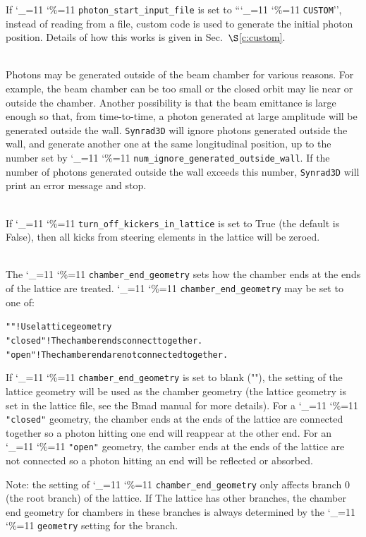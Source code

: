 \documentclass[11pt,openany]{report}
\newcommand{\sref}[1]{$\S$\ref{#1}}
\newcommand{\srthree}{\texttt{Synrad3D}\xspace}
\newcommand\ttcmd{\begingroup\catcode`\_=11 \catcode`\%=11 \dottcmd}
\newcommand\dottcmd[1]{\texttt{#1}\endgroup}
\newcommand{\vn}{\ttcmd}
\newcommand{\Newline}{\hfil \\}
\newlength{\ExBeg}
\newlength{\ExEnd}
\newenvironment{example}
  {\vspace{\ExBeg} \begin{alltt}}
  {\end{alltt} \vspace{\ExEnd}}
\begin{document}
\begin{description}
If \vn{photon_start_input_file} is set to ``\vn{CUSTOM}'', instead of reading from a file, custom
code is used to generate the initial photon position. Details of how this works is given
in Sec.~\sref{c:custom}.
  \item[\vn{num_ignore_generated_outside_wall}] \Newline
Photons may be generated outside of the beam chamber for various
reasons. For example, the beam chamber can be too small or the closed
orbit may lie near or outside the chamber. Another possibility is that
the beam emittance is large enough so that, from time-to-time, a
photon generated at large amplitude will be generated outside the
wall. \srthree will ignore photons generated outside the wall, and
generate another one at the same longitudinal position, up to the
number set by \vn{num_ignore_generated_outside_wall}. If the number of
photons generated outside the wall exceeds this number, \srthree will
print an error message and stop.
  \item[\vn{turn_off_kickers_in_lattice}] \Newline
If \vn{turn_off_kickers_in_lattice} is set to True (the default is
False), then all kicks from steering elements in the lattice will be zeroed.
  \item[\vn{chamber_end_geometry}] \Newline
The \vn{chamber_end_geometry} sets how the chamber ends at the ends of the lattice
are treated. \vn{chamber_end_geometry} may be set to one of:
\begin{example}
  ""            ! Use lattice geometry
  "closed"      ! The chamber ends connect together.
  "open"        ! The chamber end are not connected together.
\end{example}
If \vn{chamber_end_geometry} is set to blank (""), the setting of the lattice geometry
will be used as the chamber geometry (the lattice geometry is set in the lattice file, see
the Bmad manual\cite{b:bmad} for more details). For a \vn{"closed"} geometry, the chamber
ends at the ends of the lattice are connected together so a photon hitting one end will
reappear at the other end.  For an \vn{"open"} geometry, the camber ends at the ends of
the lattice are not connected so a photon hitting an end will be reflected or absorbed.

Note: the setting of \vn{chamber_end_geometry} only affects branch 0 (the root branch) of
the lattice. If The lattice has other branches, the chamber end geometry for chambers in
these branches is always determined by the \vn{geometry} setting for the branch.
\end{description}
\end{document}
